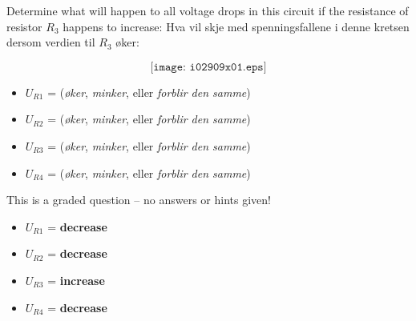 

Determine what will happen to all voltage drops in this circuit if the resistance of resistor $R_3$ happens to increase:
Hva vil skje med spenningsfallene i denne kretsen dersom verdien til $R_3$ øker:

$$\texttt{[image: i02909x01.eps]}$$

\begin{itemize}
\item{} $U_{R1}$ = ({\it øker}, {\it minker}, eller {\it forblir den samme})
\vskip 10pt
\item{} $U_{R2}$ = ({\it øker}, {\it minker}, eller {\it forblir den samme})
\vskip 10pt
\item{} $U_{R3}$ = ({\it øker}, {\it minker}, eller {\it forblir den samme})
\vskip 10pt
\item{} $U_{R4}$ = ({\it øker}, {\it minker}, eller {\it forblir den samme})
\end{itemize}

\vfil 

\eject






This is a graded question -- no answers or hints given!







\begin{itemize}
\item{} $U_{R1}$ = {\bf decrease}
\vskip 10pt
\item{} $U_{R2}$ = {\bf decrease}
\vskip 10pt
\item{} $U_{R3}$ = {\bf increase}
\vskip 10pt
\item{} $U_{R4}$ = {\bf decrease}
\end{itemize}




